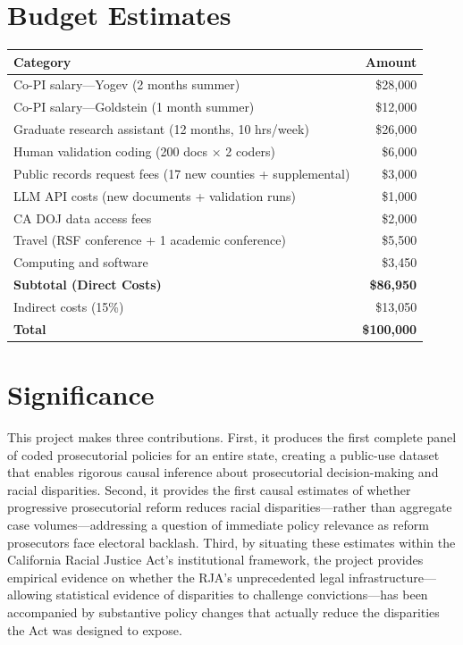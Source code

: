 \documentclass[12pt]{article}
\begin{document}
\section{Budget Estimates}

\begin{table}[h]
\centering
\begin{tabular}{lr}
\toprule
\textbf{Category} & \textbf{Amount} \\
\midrule
Co-PI salary---Yogev (2 months summer) & \$28,000 \\
Co-PI salary---Goldstein (1 month summer) & \$12,000 \\
Graduate research assistant (12 months, 10 hrs/week) & \$26,000 \\
Human validation coding (200 docs $\times$ 2 coders) & \$6,000 \\
Public records request fees (17 new counties + supplemental) & \$3,000 \\
LLM API costs (new documents + validation runs) & \$1,000 \\
CA DOJ data access fees & \$2,000 \\
Travel (RSF conference + 1 academic conference) & \$5,500 \\
Computing and software & \$3,450 \\
\midrule
\textbf{Subtotal (Direct Costs)} & \textbf{\$86,950} \\
Indirect costs (15\%) & \$13,050 \\
\midrule
\textbf{Total} & \textbf{\$100,000} \\
\bottomrule
\end{tabular}
\end{table}

\section{Significance}

This project makes three contributions. First, it produces the first complete panel of coded prosecutorial policies for an entire state, creating a public-use dataset that enables rigorous causal inference about prosecutorial decision-making and racial disparities. Second, it provides the first causal estimates of whether progressive prosecutorial reform reduces racial disparities---rather than aggregate case volumes---addressing a question of immediate policy relevance as reform prosecutors face electoral backlash. Third, by situating these estimates within the California Racial Justice Act's institutional framework, the project provides empirical evidence on whether the RJA's unprecedented legal infrastructure---allowing statistical evidence of disparities to challenge convictions---has been accompanied by substantive policy changes that actually reduce the disparities the Act was designed to expose.
\end{document}

